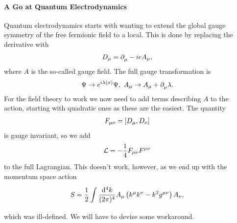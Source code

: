 \paragraph{A Go at Quantum Electrodynamics}
Quantum electrodynamics starts with wanting to extend the global gauge symmetry of the free fermionic field to a local. This is done by replacing the derivative with
\begin{align*}
	D_{\mu} = \partial^{}_{\mu} - ieA_{\mu},
\end{align*}
where $A$ is the so-called gauge field. The full gauge transformation is
\begin{align*}
	\Psi\to e^{i\lambda(x)}\Psi,\ A_{\mu}\to A_{\mu} + \partial^{}_{\mu}\lambda.
\end{align*}
For the field theory to work we now need to add terms describing $A$ to the action, starting with quadratic ones as these are the easiest. The quantity
\begin{align*}
	F_{\mu\nu} = \comm{D_{\mu}}{D_{\nu}}
\end{align*}
is gauge invariant, so we add
\begin{align*}
	\mathcal{L} = -\frac{1}{4}F_{\mu\nu}F^{\mu\nu}
\end{align*}
to the full Lagrangian. This doesn't work, however, as we end up with the momentum space action
\begin{align*}
	S = \frac{1}{2}\int\limits_{}^{}\frac{\dd[4]{k}}{(2\pi)^{4}}A_{\mu}\left(k^{\mu}k^{\nu} - k^{2}g^{\mu\nu}\right)A_{\nu},
\end{align*}
which was ill-defined. We will have to devise some workaround.

